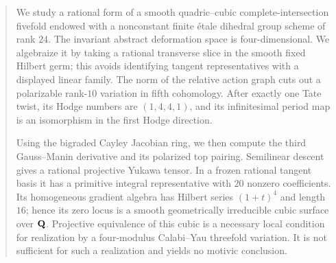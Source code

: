 \begin{abstract}
We study a rational form of a smooth quadric--cubic complete-intersection
fivefold endowed with a nonconstant finite \'etale dihedral group scheme of
rank \(24\).  The invariant abstract deformation space is four-dimensional.
We algebraize it by taking a rational transverse slice in the smooth fixed
Hilbert germ; this avoids identifying tangent representatives with a
displayed linear family.  The norm of the relative action graph cuts out a
polarizable rank-\(10\) variation in fifth cohomology.  After exactly one
Tate twist, its Hodge numbers are \((1,4,4,1)\), and its infinitesimal period
map is an isomorphism in the first Hodge direction.

Using the bigraded Cayley Jacobian ring, we then compute the third
Gauss--Manin derivative and its polarized top pairing.  Semilinear descent
gives a rational projective Yukawa tensor.  In a frozen rational tangent
basis it has a primitive integral representative with \(20\) nonzero
coefficients.  Its homogeneous gradient algebra has Hilbert series
\((1+t)^4\) and length \(16\); hence its zero locus is a smooth
geometrically irreducible cubic surface over \(\Q\).  Projective equivalence
of this cubic is a necessary local condition for realization by a
four-modulus Calabi--Yau threefold variation.  It is not sufficient for such
a realization and yields no motivic conclusion.
\end{abstract}

